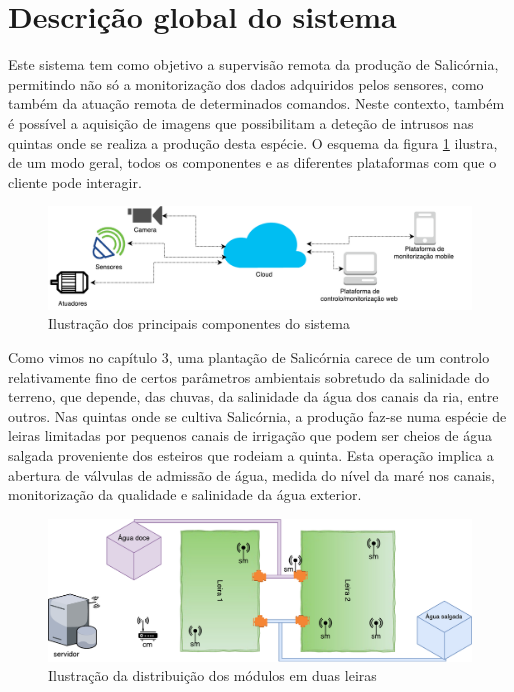 \newpage

\section{Descrição global do sistema}

Este sistema tem como objetivo a supervisão remota da produção de Salicórnia, permitindo não só a monitorização dos dados adquiridos pelos sensores, como também da atuação remota de determinados comandos. Neste contexto, também é possível a aquisição de imagens que possibilitam a deteção de intrusos nas quintas onde se realiza a produção desta espécie. O esquema da figura \ref{componentesalla} ilustra, de um modo geral, todos os componentes e as diferentes plataformas com que o cliente pode interagir. 


\begin{figure}[!htb]
	\centering
	\includegraphics[width=\linewidth]{esquemas/global_arquitetura.pdf}
	\caption{Ilustração dos principais componentes do sistema}
	\label{componentesalla}
\end{figure}






Como vimos no capítulo 3, uma plantação de  Salicórnia carece de um controlo relativamente fino de certos parâmetros ambientais sobretudo da salinidade do terreno, que depende, das chuvas, da salinidade da água dos canais da ria, entre outros. Nas quintas onde se cultiva Salicórnia, a produção faz-se numa espécie de leiras limitadas por pequenos canais de irrigação que podem ser cheios de água salgada proveniente dos esteiros que rodeiam a quinta. Esta operação implica a abertura de válvulas de admissão de água, medida do nível da maré nos canais, monitorização da qualidade e salinidade da água exterior.



\begin{figure}[!htb]
	\centering
	\includegraphics[width=\linewidth]{esquemas/leiras-comm-geral.pdf}
	\caption{Ilustração da distribuição dos módulos em duas leiras}
	\label{leira}
\end{figure}


